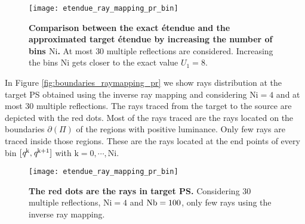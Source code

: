 \begin{figure}[t]
  \begin{center}
  \texttt{[image: etendue\_ray\_mapping\_pr\_bin]}
  \end{center}
  \caption{\textbf{Comparison between the exact \'{e}tendue and the approximated target \'{e}tendue by increasing the number of bins $\textrm{Ni}$.}
 At most $30$ multiple reflections are considered. Increasing the bins $\textrm{Ni}$ gets closer to the exact value $U_1=8$.}
\label{fig:etendue_ray_mapping_pr_bin}
 \end{figure}
In Figure \ref{fig:boundaries_raymapping_pr} we show rays distribution at the target PS obtained using the inverse ray mapping and considering $\textrm{Ni}=4$ and at most $30$ multiple reflections. The rays traced from the target to the source are depicted with the red dots. Most of the rays traced are the rays located on the boundaries $\partial$$(\Pi)$ of the regions with positive luminance. 
Only few rays are traced inside those regions. These are the rays located at the end points of every bin $[\textit{q}^{\textrm{k}}, \textit{q}^{\textrm{k+1}}]$ with $\textrm{k}=0, \cdots, \textrm{Ni}$. 
\begin{figure}[t]
  \begin{center}
  \texttt{[image: etendue\_ray\_mapping\_pr\_bin]}
  \end{center}
  \caption{\textbf{The red dots are the rays in target PS.}
 Considering $30$ multiple reflections, $\textrm{Ni}=4$ and $\textrm{Nb} = 100$, only few rays using the inverse ray mapping.}
\label{fig:boundaries_rays_pr_raymapping}
 \end{figure}
\\ \indent
